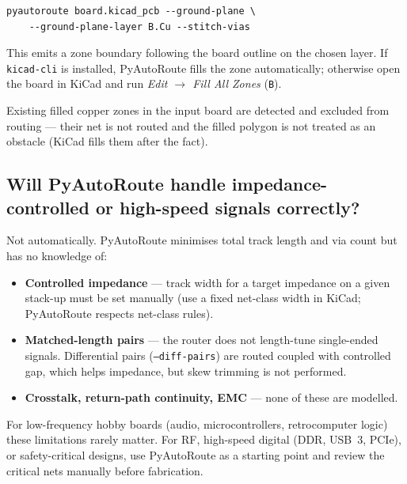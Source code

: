 \documentclass[11pt,a4paper]{article}
\begin{document}
\begin{lstlisting}
pyautoroute board.kicad_pcb --ground-plane \
    --ground-plane-layer B.Cu --stitch-vias
\end{lstlisting}

This emits a zone boundary following the board outline on the chosen
layer. If \texttt{kicad-cli} is installed, PyAutoRoute fills the zone
automatically; otherwise open the board in KiCad and run
\emph{Edit $\to$ Fill All Zones} (\texttt{B}).

Existing filled copper zones in the input board are detected and
excluded from routing --- their net is not routed and the filled polygon
is not treated as an obstacle (KiCad fills them after the fact).

\subsection*{Will PyAutoRoute handle impedance-controlled or high-speed signals correctly?}

Not automatically. PyAutoRoute minimises total track length and via count
but has no knowledge of:

\begin{itemize}
    \item \textbf{Controlled impedance} --- track width for a target
          impedance on a given stack-up must be set manually (use a fixed
          net-class width in KiCad; PyAutoRoute respects net-class rules).
    \item \textbf{Matched-length pairs} --- the router does not length-tune
          single-ended signals. Differential pairs (\texttt{--diff-pairs})
          are routed coupled with controlled gap, which helps impedance,
          but skew trimming is not performed.
    \item \textbf{Crosstalk, return-path continuity, EMC} --- none of
          these are modelled.
\end{itemize}

For low-frequency hobby boards (audio, microcontrollers, retrocomputer
logic) these limitations rarely matter. For RF, high-speed digital
(DDR, USB~3, PCIe), or safety-critical designs, use PyAutoRoute as a
starting point and review the critical nets manually before fabrication.
\end{document}

